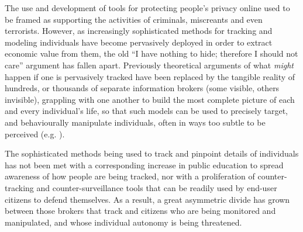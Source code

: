 \documentclass{IOS-Book-Article}     %
\begin{document}
The use and development of tools for protecting people's privacy online used to
be framed as supporting the activities of criminals, miscreants and even terrorists.  
However, as increasingly sophisticated methods for tracking and modeling individuals
have become pervasively deployed in order to extract economic value from them, 
the old ``I have nothing to hide; therefore I should not care'' argument has fallen apart. 
Previously theoretical arguments of what \emph{might} happen if one is pervasively tracked have been replaced by the tangible reality of hundreds, or thousands of separate information brokers 
(some visible, others invisible), grappling with one another to build the most 
complete picture of each and every individual's life, so that such models 
can be used to precisely target, and behaviourally manipulate individuals,
often in ways too subtle to be perceived (e.g. \cite{Kramer17062014}). 

The sophisticated methods being used to track and pinpoint details of individuals 
has not been met with a corresponding increase in public education to spread awareness
of how people are being tracked, nor with a proliferation of counter-tracking and 
counter-surveillance tools that can be readily used by end-user citizens to defend 
themselves.  As a result, a great asymmetric divide has grown between 
those brokers that track and citizens who are being monitored and manipulated, 
and whose individual autonomy is being threatened.  

% 


\end{document}
